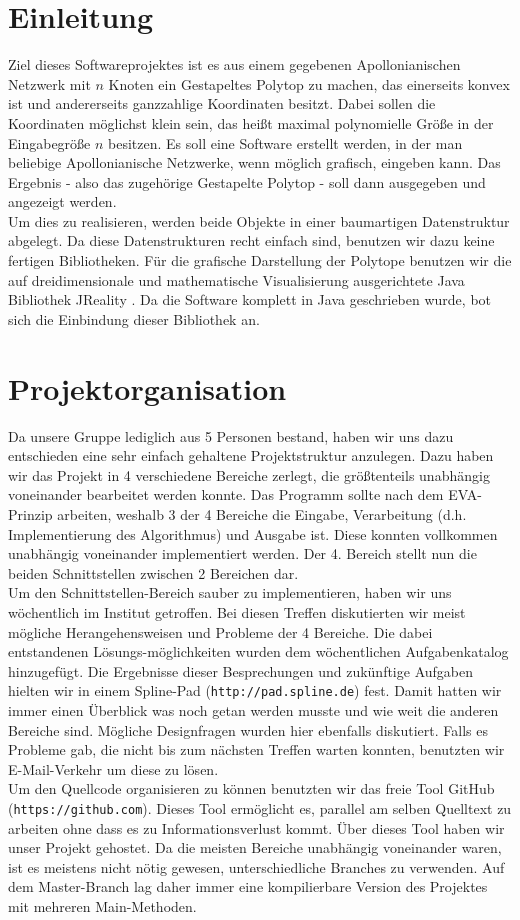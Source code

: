 \section*{Einleitung}
Ziel dieses Softwareprojektes ist es aus einem gegebenen Apollonianischen Netzwerk mit $n$ Knoten ein Gestapeltes Polytop zu machen, das einerseits konvex ist und andererseits ganzzahlige Koordinaten besitzt. Dabei sollen die Koordinaten möglichst klein sein, das heißt maximal polynomielle Größe in der Eingabegröße $n$ besitzen. Es soll eine Software erstellt werden, in der man beliebige Apollonianische Netzwerke, wenn möglich grafisch, eingeben kann. Das Ergebnis - also das zugehörige Gestapelte Polytop - soll dann ausgegeben und angezeigt werden.\\
Um dies zu realisieren, werden beide Objekte in einer baumartigen Datenstruktur abgelegt. Da diese Datenstrukturen recht einfach sind, benutzen wir dazu keine fertigen Bibliotheken. Für die grafische Darstellung der Polytope benutzen wir die auf dreidimensionale und mathematische Visualisierung ausgerichtete Java Bibliothek JReality \cite{jreality}. Da die Software komplett in Java geschrieben wurde, bot sich die Einbindung dieser Bibliothek an.

\section*{Projektorganisation}
Da unsere Gruppe lediglich aus 5 Personen bestand, haben wir uns dazu entschieden eine sehr einfach gehaltene Projektstruktur anzulegen. Dazu haben wir das Projekt in 4 verschiedene Bereiche zerlegt, die größtenteils unabhängig voneinander bearbeitet werden konnte. Das Programm sollte nach dem EVA-Prinzip arbeiten, weshalb 3 der 4 Bereiche die Eingabe, Verarbeitung (d.h. Implementierung des Algorithmus) und Ausgabe ist. Diese konnten vollkommen unabhängig voneinander implementiert werden. Der 4. Bereich stellt nun die beiden Schnittstellen zwischen 2 Bereichen dar.\\
Um den Schnittstellen-Bereich sauber zu implementieren, haben wir uns wöchentlich im Institut getroffen. Bei diesen Treffen diskutierten wir meist mögliche Herangehensweisen und Probleme der 4 Bereiche. Die dabei entstandenen Lösungs-möglichkeiten wurden dem wöchentlichen Aufgabenkatalog hinzugefügt. Die Ergebnisse dieser Besprechungen und zukünftige Aufgaben hielten wir in einem Spline-Pad (\texttt{http://pad.spline.de}) fest. Damit hatten wir immer einen Überblick was noch getan werden musste und wie weit die anderen Bereiche sind. Mögliche Designfragen wurden hier ebenfalls diskutiert. Falls es Probleme gab, die nicht bis zum nächsten Treffen warten konnten, benutzten wir E-Mail-Verkehr um diese zu lösen.\\
Um den Quellcode organisieren zu können benutzten wir das freie Tool GitHub (\texttt{https://github.com}). Dieses Tool ermöglicht es, parallel am selben Quelltext zu arbeiten ohne dass es zu Informationsverlust kommt. Über dieses Tool haben wir unser Projekt gehostet. Da die meisten Bereiche unabhängig voneinander waren, ist es meistens nicht nötig gewesen, unterschiedliche Branches zu verwenden. Auf dem Master-Branch lag daher immer eine kompilierbare Version des Projektes mit mehreren Main-Methoden.


